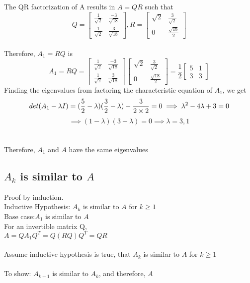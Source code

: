 \documentclass[12pt]{article}
\begin{document}
    The QR factorization of A results in $A = QR$ such that \\
    $$
    Q = \begin{bmatrix}
        \frac{1}{\sqrt{2}} & \frac{-3}{\sqrt{18}} \\
        \frac{1}{\sqrt{2}} & \frac{3}{\sqrt{18}} 
        \end{bmatrix},
    R = \begin{bmatrix}
        \sqrt{2} & \frac{3}{\sqrt{2}} \\
        0 & \frac{\sqrt{18}}{2} 
        \end{bmatrix}
    $$ \\
    Therefore, $A_1 = RQ$ is \\
    $$
    A_1 = RQ = 
    \begin{bmatrix}
        \frac{1}{\sqrt{2}} & \frac{-3}{\sqrt{18}} \\
        \frac{1}{\sqrt{2}} & \frac{3}{\sqrt{18}} 
    \end{bmatrix}
    \begin{bmatrix}
        \sqrt{2} & \frac{3}{\sqrt{2}} \\
        0 & \frac{\sqrt{18}}{2} 
    \end{bmatrix}
    = \frac{1}{2}
     \begin{bmatrix}
        5 & 1 \\
        3 & 3 
    \end{bmatrix}
    $$
    Finding the eigenvalues from factoring the characteristic equation of $A_1$, we get \\
    $$det(A_1 - \lambda I) = (\frac{5}{2} - \lambda)(\frac{3}{2} - \lambda) - \frac{3}{2 \times 2} = 0 \implies \lambda^2 -4\lambda +3 = 0  \\
    $$
    $$\implies (1 - \lambda)(3 - \lambda) = 0 \implies \lambda = 3,1$$ \\\\

    Therefore, $A_1$ and $A$ have the same eigenvalues


\subsection{$A_k$ is similar to $A$}

Proof by induction. \\
Inductive Hypothesis: $A_k$ is similar to $A$ for $k \geq 1$ \\
Base case:$A_1$ is similar to $A$ \\
For an invertible matrix Q, \\
$A = QA_{1}Q^T = Q (RQ) Q^T = QR$ \\ \\
Assume inductive hypothesis is true, that $A_k$ is similar to $A$ for $k \geq 1$ \\ \\
To show: $A_{k+1}$ is similar to $A_k$, and therefore, $A$ \\
\end{document}
